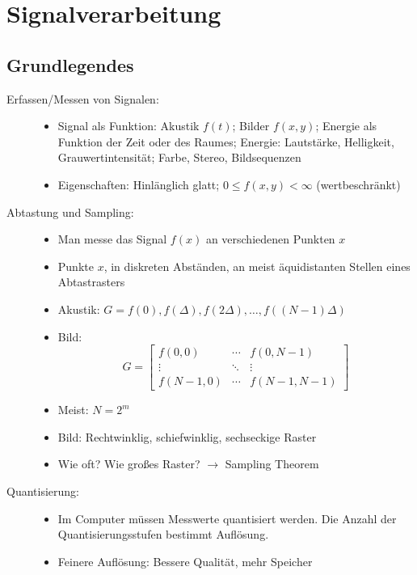
\section{Signalverarbeitung}

\subsection{Grundlegendes}

\begin{description}
\item[Erfassen/Messen von Signalen:] \quad
\begin{itemize}
\item Signal als Funktion: Akustik $f(t)$; Bilder $f(x,y)$; Energie als Funktion der Zeit oder des Raumes; Energie: Lautstärke, Helligkeit, Grauwertintensität; Farbe, Stereo, Bildsequenzen
\item Eigenschaften: Hinlänglich glatt; $0 \leq f(x,y) < \infty$ (wertbeschränkt)
\end{itemize}
\item[Abtastung und Sampling:] \quad
\begin{itemize}
\item Man messe das Signal $f(x)$ an verschiedenen Punkten $x$
\item Punkte $x$, in diskreten Abständen, an meist äquidistanten Stellen eines Abtastrasters
\item Akustik: $G = f(0), f(\Delta), f(2 \Delta), \dots, f((N-1)\Delta)$
\item Bild: $$G = \left[ \begin{array}{ccc} f(0,0) & \cdots & f(0,N-1) \\ \vdots & \ddots & \vdots \\ f(N-1,0) & \cdots & f(N-1,N-1) \end{array} \right]$$
\item Meist: $N = 2^m$
\item Bild: Rechtwinklig, schiefwinklig, sechseckige Raster
\item Wie oft? Wie großes Raster? $\to$ Sampling Theorem
\end{itemize}
\item[Quantisierung:] \quad
\begin{itemize}
\item Im Computer müssen Messwerte quantisiert werden. Die Anzahl der Quantisierungsstufen bestimmt Auflösung.
\item Feinere Auflösung: Bessere Qualität, mehr Speicher

\end{itemize}
\end{description}
